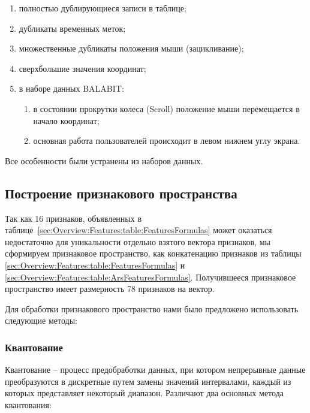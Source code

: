 \documentclass[12pt]{article}
\begin{document}
    \begin{enumerate}
        \item полностью дублирующиеся записи в таблице;
        \item дубликаты временных меток;
        \item множественные дубликаты положения мыши (зацикливание);
        \item сверхбольшие значения координат;
        \item в наборе данных BALABIT:
        \begin{enumerate}
            \item в состоянии прокрутки колеса (Scroll) положение мыши перемещается в начало координат;
            \item основная работа пользователей происходит в левом нижнем углу экрана.
        \end{enumerate}
    \end{enumerate}

    \noindent Все особенности были устранены из наборов данных.


    \subsection{Построение признакового пространства}
    \label{sec:Research:FeatureSpace}

    \par Так как 16 признаков, объявленных в таблице~\ref{sec:Overview:Features:table:FeaturesFormulas} может оказаться недостаточно для уникальности отдельно взятого вектора признаков, мы сформируем признаковое пространство, как конкатенацию признаков из таблицы \ref{sec:Overview:Features:table:FeaturesFormulas} и \ref{sec:Overview:Features:table:ArsFeaturesFormulas}. Получившееся признаковое пространство имеет размерность 78 признаков на вектор.

    \par Для обработки признакового пространство нами было предложено использовать следующие методы:

    \subsubsection{Квантование}
    \label{sec:Research:FeatureSpace:Quantile}

    \par Квантование \cite{BINNING} -- процесс предобработки данных, при котором непрерывные данные преобразуются в дискретные путем замены значений интервалами, каждый из которых представляет некоторый диапазон. Различают два основных метода квантования:
\end{document}
